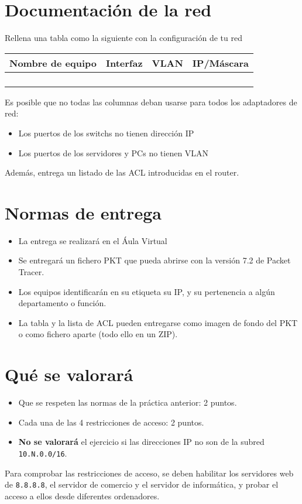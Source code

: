 \section{Documentación de la red}
Rellena una tabla como la siguiente con la configuración de tu red

\begin{center}
  \begin{tabular}{|c|c|c|c|}
    \hline
    Nombre de equipo & Interfaz & VLAN & IP/Máscara \\
    \hline
                     & & & \\
                     & & & \\
                     & & & \\
                     & & & \\
    \hline
  \end{tabular}
\end{center}

Es posible que no todas las columnas deban usarse para todos los adaptadores de red:
\begin{itemize}
\item Los puertos de los switchs no tienen dirección IP
\item Los puertos de los servidores y PCs no tienen VLAN
\end{itemize}

Además, entrega un listado de las ACL introducidas en el router.

\section{Normas de entrega}
\begin{itemize}
  
\item La entrega se realizará en el Áula Virtual
\item Se entregará un fichero PKT que pueda abrirse con la versión 7.2 de Packet Tracer.
\item Los equipos identificarán en su etiqueta su IP, y su pertenencia a algún departamento o función.
\item La tabla y la lista de ACL pueden entregarse como imagen de fondo del PKT o como fichero aparte (todo ello en un ZIP).
\end{itemize}

\section{Qué se valorará}
\begin{itemize}
\item Que se respeten las normas de la práctica anterior: 2 puntos.
\item Cada una de las 4 restricciones de acceso: 2 puntos.
\item \textbf{No se valorará} el ejercicio si las direcciones IP no son de la subred \texttt{10.N.0.0/16}.
\end{itemize}

Para comprobar las restricciones de acceso, se deben habilitar los servidores web de \texttt{8.8.8.8}, el servidor de comercio y el servidor de informática, y probar el acceso a ellos desde diferentes ordenadores.




